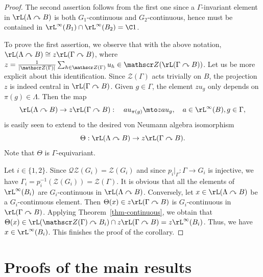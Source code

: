 \begin{proof}
The second assertion follows from the first one since a $\Gamma$-invariant element in $\rL(\Lambda \curvearrowright B)$ is both $G_1$-continuous and $G_2$-continuous, hence must be contained in $\rL^\infty(B_1) \cap \rL^\infty(B_2) = \C 1$.

To prove the first assertion, we observe that with the above notation, $\rL(\Lambda \curvearrowright B) \cong z \rL(\Gamma \curvearrowright B)$, where $z = \frac{1}{|\mathscr Z(\Gamma)|} \sum_{h \in \mathscr Z(\Gamma)} u_h \in \mathscr Z(\rL(\Gamma \curvearrowright B))$. Let us be more explicit about this identification. Since $\mathscr Z(\Gamma)$ acts trivially on $B$, the projection $z$ is indeed central in $\rL(\Gamma \curvearrowright B)$. Given $g \in \Gamma$, the element $zu_g$ only depends on $\pi(g) \in \Lambda$. Then the map
\[
\rL(\Lambda \curvearrowright B) \to z\rL(\Gamma \curvearrowright B) : \quad a u_{\pi(g)} \mto zau_g, \quad a \in \rL^\infty(B), g \in \Gamma,
\]
is easily seen to extend to the desired von Neumann algebra isomorphism \[
\Theta : \rL(\Lambda \curvearrowright B) \to z\rL(\Gamma \curvearrowright B).
\]
Note that $\Theta$ is $\Gamma$-equivariant.

Let $i \in \{1,2\}$. Since $\mathscr{Q}\mathscr{Z}(G_i) = \mathscr Z(G_i)$ and since $p_i|_\Gamma : \Gamma \to G_i$ is injective, we have $\Gamma_i = p_i^{-1}( \mathscr Z(G_i)) = \mathscr Z(\Gamma)$. It is obvious that all the elements of $\rL^\infty(B_i)$ are $G_i$\nobreakdash-con\-tinuous in $\rL(\Lambda \curvearrowright B)$. Conversely, let $x \in \rL(\Lambda \curvearrowright B)$ be a $G_i$-continuous element. Then $\Theta(x) \in z\rL(\Gamma \curvearrowright B)$ is $G_i$-continuous in $\rL(\Gamma \curvearrowright B)$. Applying Theorem~\ref{thm-continuous}, we obtain that $\Theta(x) \in \rL(\mathscr Z(\Gamma) \curvearrowright B_i) \cap z\rL(\Gamma \curvearrowright B) = z \rL^\infty(B_i)$. Thus, we have $x \in \rL^\infty(B_i)$. This finishes the proof of the corollary.
\end{proof}

\section{Proofs of the main results}

